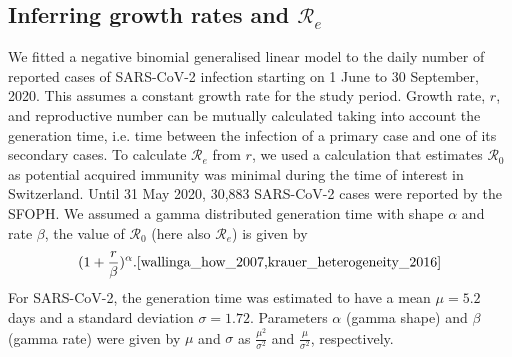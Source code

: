 \documentclass[10pt, a4paper, twoside]{article}
\begin{document}
\begin{multicols}{2}
\subsection{Inferring growth rates and $\mathcal{R}_e$}
\label{marker}
We fitted a negative binomial generalised linear model to the daily number of reported cases of SARS-CoV-2 infection starting on 1 June to 30 September, 2020. 
This assumes a constant growth rate for the study period.
Growth rate, $r$, and reproductive number can be mutually calculated taking into account the generation time, i.e. time between the infection of a primary case and one of its secondary cases.\cite{svensson_note_2007}
To calculate $\mathcal{R}_e$ from $r$, we used a calculation that estimates $\mathcal{R}_0$ as potential acquired immunity was minimal during the time of interest in Switzerland.
Until 31 May 2020, 30,883 SARS-CoV-2 cases were reported by the SFOPH.\cite{federal_office_of_public_health_coronavirus_nodate}
We assumed a gamma distributed generation time with shape $\alpha$ and rate $\beta$, the value of $\mathcal{R}_0$ (here also $\mathcal{R}_e$) is given by \[ (1 + \frac{r}{\beta} )^\alpha.\cite{wallinga_how_2007,krauer_heterogeneity_2016} \]
For SARS-CoV-2, the generation time was estimated to have a mean $\mu= 5.2$ days and a standard deviation $\sigma = 1.72$.\cite{ganyani_estimating_2020}
Parameters $\alpha$ (gamma shape) and $\beta$  (gamma rate) were given by $\mu$ and $\sigma$ as $\frac{\mu^2}{\sigma^2 }$ and $\frac{\mu}{\sigma^2}$, respectively.


\end{multicols}
\end{document}
